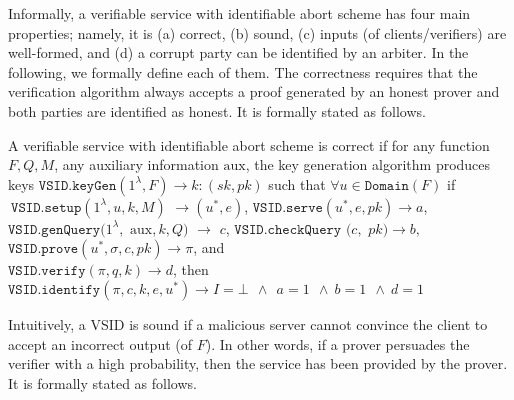 Informally, a verifiable service with  identifiable abort scheme  has four main properties; namely, it is (a) correct, (b) sound, (c)  inputs (of clients/verifiers) are well-formed, and (d) a corrupt party can be identified by an arbiter. In the following, we formally define each of them. The correctness requires that  the verification algorithm always accepts a proof generated by an honest prover and both parties are identified as honest.  It is formally stated as follows.

\begin{definition} A verifiable service with identifiable abort scheme  is  correct   if for any function $F,Q,M$, any auxiliary information $\text{aux}$, the key generation algorithm produces keys $\mathtt{VSID.keyGen}(1^{\lambda},F)\rightarrow k:(sk,pk)$ such that $\forall u \in \mathtt{Domain}(F)$ if $\ \mathtt{VSID.setup}(1^{\lambda}, u,k,M)$ $\rightarrow (u^{\scriptscriptstyle *},e)$, $\mathtt{VSID.serve}(u^{\scriptscriptstyle *},e,pk)\rightarrow a$, $\mathtt{VSID.genQuery}(1^{\lambda}, $ $ \text{aux},k,Q)$ $ \rightarrow$ $ c$, $\mathtt{VSID.checkQuery}$ $(c, $ $pk)\rightarrow b,$  $\mathtt{VSID.prove}(u^{\scriptscriptstyle *},\sigma,c,pk)\rightarrow \pi$, and \\$\mathtt{VSID.verify}(\pi,q,k)\rightarrow d$, then  $\mathtt{VSID.identify}(\pi,c,k,e,u^{\scriptscriptstyle *})\rightarrow I=\bot \  \  \wedge \ \ a=1 \ \ \wedge \  b=1 \ \ \wedge \  d=1$
\end{definition}



Intuitively, a VSID is sound  if a malicious server cannot convince the client to accept an incorrect output (of $F$). In other words, if a prover persuades the verifier with a high probability, then the service has been provided by the prover. It is  formally stated as follows.

